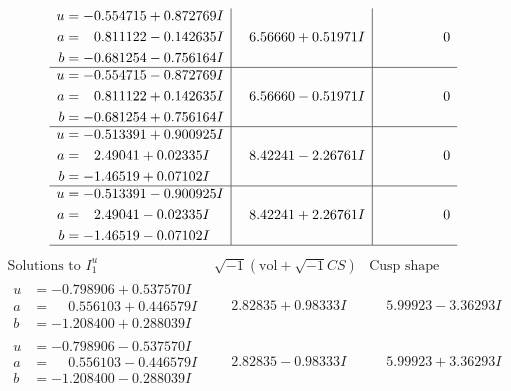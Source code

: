 \documentclass[1p]{elsarticle_modified}
\theoremstyle{definition}
\newcommand{\I}{\sqrt{-1}}
\begin{document}
$$\begin{array}{c|c|c}
\begin{aligned}
u &= -0.554715 + 0.872769 I \\
a &= \phantom{-}0.811122 - 0.142635 I \\
b &= -0.681254 - 0.756164 I\end{aligned}
 & \phantom{-}6.56660 + 0.51971 I & \phantom{-0.000000 } 0 \\ \hline\begin{aligned}
u &= -0.554715 - 0.872769 I \\
a &= \phantom{-}0.811122 + 0.142635 I \\
b &= -0.681254 + 0.756164 I\end{aligned}
 & \phantom{-}6.56660 - 0.51971 I & \phantom{-0.000000 } 0 \\ \hline\begin{aligned}
u &= -0.513391 + 0.900925 I \\
a &= \phantom{-}2.49041 + 0.02335 I \\
b &= -1.46519 + 0.07102 I\end{aligned}
 & \phantom{-}8.42241 - 2.26761 I & \phantom{-0.000000 } 0 \\ \hline\begin{aligned}
u &= -0.513391 - 0.900925 I \\
a &= \phantom{-}2.49041 - 0.02335 I \\
b &= -1.46519 - 0.07102 I\end{aligned}
 & \phantom{-}8.42241 + 2.26761 I & \phantom{-0.000000 } 0\\
 \hline 
 \end{array}$$\newpage$$\begin{array}{c|c|c}  
\text{Solutions to }I^u_{1}& \I (\text{vol} + \sqrt{-1}CS) & \text{Cusp shape}\\
 \hline 
\begin{aligned}
u &= -0.798906 + 0.537570 I \\
a &= \phantom{-}0.556103 + 0.446579 I \\
b &= -1.208400 + 0.288039 I\end{aligned}
 & \phantom{-}2.82835 + 0.98333 I & \phantom{-}5.99923 - 3.36293 I \\ \hline\begin{aligned}
u &= -0.798906 - 0.537570 I \\
a &= \phantom{-}0.556103 - 0.446579 I \\
b &= -1.208400 - 0.288039 I\end{aligned}
 & \phantom{-}2.82835 - 0.98333 I & \phantom{-}5.99923 + 3.36293 I \\ \hline\begin{aligned}

\end{aligned}
\end{array}$$
\end{document}

